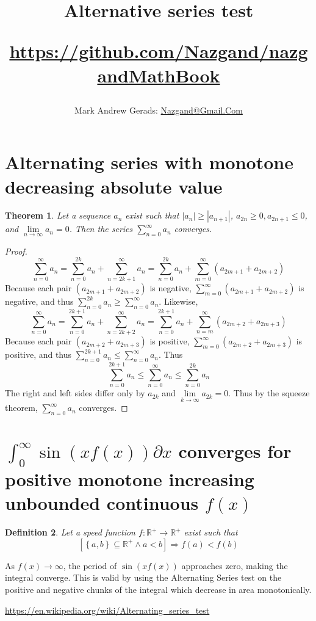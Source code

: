 \documentclass[]{article}
\author{Mark Andrew Gerads: \href{MailTo:Nazgand@Gmail.Com}{Nazgand@Gmail.Com}}
\title{
	Alternative series test
	
	\href{https://github.com/Nazgand/nazgandMathBook}{https://github.com/Nazgand/nazgandMathBook}
}
\newcommand{\pqty}[1]{{\left(#1\right)}}
\newcommand{\Bqty}[1]{{\left\{#1\right\}}}
\newcommand{\bqty}[1]{{\left[#1\right]}}
\newcommand{\abs}[1]{{\left\lvert#1\right\rvert}}
\newtheorem{theorem}{Theorem}[section]
\newtheorem{definition}[theorem]{Definition}
\numberwithin{equation}{section}
\begin{document}
	
	\maketitle
	\section{Alternating series with monotone decreasing absolute value}
	
	\begin{theorem}
		Let a sequence \(a_n\) exist such that \(\abs{a_n}\geq\abs{a_{n+1}}\), \(a_{2n}\geq 0,a_{2n+1}\leq 0\), and \(\lim\limits_{n\to\infty}a_n=0\). Then the series \(\sum_{n=0}^{\infty}a_n\) converges.
	\end{theorem}
	\begin{proof}
		\begin{equation}
			\sum_{n=0}^{\infty}a_n
			=
			\sum_{n=0}^{2k}a_n+\sum_{n=2k+1}^{\infty}a_n
			=
			\sum_{n=0}^{2k}a_n+\sum_{m=0}^{\infty}\pqty{a_{2m+1}+a_{2m+2}}
		\end{equation}
		Because each pair \(\pqty{a_{2m+1}+a_{2m+2}}\) is negative, \(\sum_{m=0}^{\infty}\pqty{a_{2m+1}+a_{2m+2}}\) is negative, and thus \(\sum_{n=0}^{2k}a_n\geq \sum_{n=0}^{\infty}a_n\). Likewise,
		\begin{equation}
		\sum_{n=0}^{\infty}a_n
		=
		\sum_{n=0}^{2k+1}a_n+\sum_{n=2k+2}^{\infty}a_n
		=
		\sum_{n=0}^{2k+1}a_n+\sum_{n=m}^{\infty}\pqty{a_{2m+2}+a_{2m+3}}
		\end{equation}
		Because each pair \(\pqty{a_{2m+2}+a_{2m+3}}\) is positive, \(\sum_{m=0}^{\infty}\pqty{a_{2m+2}+a_{2m+3}}\) is positive, and thus \(\sum_{n=0}^{2k+1}a_n\leq \sum_{n=0}^{\infty}a_n\). Thus
		\begin{equation}
			\sum_{n=0}^{2k+1}a_n\leq
			\sum_{n=0}^{\infty}a_n\leq
			\sum_{n=0}^{2k}a_n
		\end{equation}
		The right and left sides differ only by \(a_{2k}\) and \(\lim\limits_{k\to\infty}a_{2k}=0\). Thus by the squeeze theorem, \(\sum_{n=0}^{\infty}a_n\) converges.
	\end{proof}
	
	\section{\(\int_{0}^{\infty}\sin\pqty{xf\pqty{x}}\partial x\) converges for positive monotone increasing unbounded continuous \(f\pqty{x}\)}
	\begin{definition}
		Let a speed function \(f:\mathbb{R}^+\to\mathbb{R}^+\) exist such that
		\begin{equation}
		\bqty{\Bqty{a,b}\subseteq\mathbb{R}^+\land a<b}
		\Rightarrow
		f\pqty{a}<f\pqty{b}
		\end{equation}
	\end{definition}

	As \(f\pqty{x}\to\infty\), the period of \(\sin\pqty{xf\pqty{x}}\) approaches zero, making the integral converge. This is valid by using the Alternating Series test on the positive and negative chunks of the integral which decrease in area monotonically.
	
	\url{https://en.wikipedia.org/wiki/Alternating_series_test}
	
\end{document}
